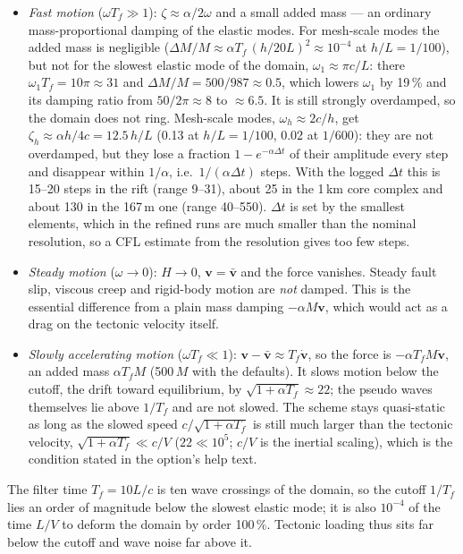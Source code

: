 \documentclass[11pt]{article}
\newcommand{\vbar}{\bar{\mathbf v}}
\begin{document}
\begin{itemize}
\item \emph{Fast motion} ($\omega T_f\gg1$): $\zeta\approx\alpha/2\omega$ and a small added mass
  --- an ordinary mass-proportional damping of the elastic modes. For mesh-scale modes the added
  mass is negligible ($\Delta M/M\approx\alpha T_f\,(h/20L)^2\approx10^{-4}$ at $h/L=1/100$), but
  not for the slowest elastic mode of the domain, $\omega_1\approx\pi c/L$: there
  $\omega_1T_f=10\pi\approx31$ and $\Delta M/M=500/987\approx0.5$, which lowers $\omega_1$ by
  19\,\% and its damping ratio from $50/2\pi\approx8$ to $\approx6.5$. It is still strongly
  overdamped, so the domain does not ring. Mesh-scale modes, $\omega_h\approx 2c/h$, get
  $\zeta_h\approx\alpha h/4c=12.5\,h/L$ (0.13 at $h/L=1/100$, 0.02 at $1/600$): they are not
  overdamped, but they lose a fraction $1-e^{-\alpha\Delta t}$ of their amplitude every step and
  disappear within $1/\alpha$, i.e.\ $1/(\alpha\Delta t)$ steps. With the logged $\Delta t$ this is
  15--20 steps in the rift (range 9--31), about 25 in the 1\,km core complex and about 130 in the
  167\,m one (range 40--550). $\Delta t$ is set by the smallest elements, which in the refined runs
  are much smaller than the nominal resolution, so a CFL estimate from the resolution gives too few
  steps.
\item \emph{Steady motion} ($\omega\to0$): $H\to0$, $\mathbf v=\vbar$ and the force vanishes.
  Steady fault slip, viscous creep and rigid-body motion are \emph{not} damped. This is the
  essential difference from a plain mass damping $-\alpha M\mathbf v$, which would act as a drag on
  the tectonic velocity itself.
\item \emph{Slowly accelerating motion} ($\omega T_f\ll1$): $\mathbf v-\vbar\approx T_f\dot{\mathbf v}$,
  so the force is $-\alpha T_f M\dot{\mathbf v}$, an added mass $\alpha T_f M$ (500\,$M$ with the
  defaults). It slows motion below the cutoff, the drift toward equilibrium, by
  $\sqrt{1+\alpha T_f}\approx22$; the pseudo waves themselves lie above $1/T_f$ and are not
  slowed. The scheme stays quasi-static as long as the slowed speed $c/\sqrt{1+\alpha T_f}$ is
  still much larger than the tectonic velocity, $\sqrt{1+\alpha T_f}\ll c/V$ ($22\ll10^5$; $c/V$
  is the inertial scaling), which is the condition stated in the option's help text.
\end{itemize}
The filter time $T_f=10L/c$ is ten wave crossings of the domain, so the cutoff $1/T_f$ lies an
order of magnitude below the slowest elastic mode; it is also $10^{-4}$ of the time $L/V$ to deform
the domain by order 100\,\%. Tectonic loading thus sits far below the cutoff and wave noise far
above it.
\end{document}
